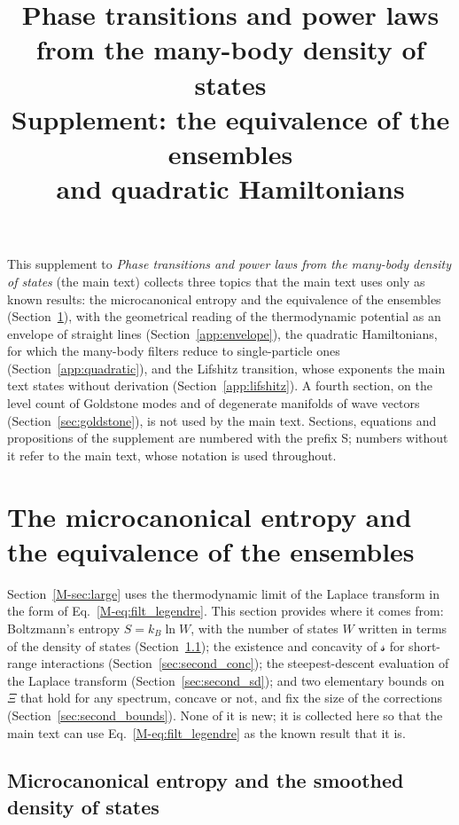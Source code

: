 \documentclass[10pt,a4paper]{article}
\title{Phase transitions and power laws\\ from the many-body density of states\\
\large Supplement: the equivalence of the ensembles\\ and quadratic Hamiltonians}
\author{}
\date{}
\theoremstyle{plain}
\theoremstyle{remark}
\newcommand{\lds}{\mathscr{s}}  %
\begin{document}
\maketitle

\noindent This supplement to \emph{Phase transitions and power laws from
the many-body density of states} (the main text) collects three topics that the main text uses
only as known results: the microcanonical entropy and the equivalence of
the ensembles (Section~\ref{app:second}), with the geometrical reading of
the thermodynamic potential as an envelope of straight lines
(Section~\ref{app:envelope}), the quadratic
Hamiltonians, for which the many-body filters reduce to single-particle
ones (Section~\ref{app:quadratic}), and the Lifshitz transition, whose
exponents the main text states without derivation
(Section~\ref{app:lifshitz}). A fourth section, on the level count of
Goldstone modes and of degenerate manifolds of wave vectors
(Section~\ref{sec:goldstone}), is not used by the main text. Sections, equations and propositions of
the supplement are numbered with the prefix S; numbers without it refer to
the main text, whose notation is used throughout.

\tableofcontents

\section{The microcanonical entropy and the equivalence of the ensembles}
\label{app:second}

Section~\ref{M-sec:large} uses the thermodynamic limit of the Laplace
transform in the form of Eq.~\eqref{M-eq:filt_legendre}. This section provides
where it comes from: Boltzmann's entropy $S=k_B\ln W$, with the number of
states $W$ written in terms of the density of states
(Section~\ref{sec:second_mc}); the existence and concavity of $\lds$ for
short-range interactions (Section~\ref{sec:second_conc}); the
steepest-descent evaluation of the Laplace transform
(Section~\ref{sec:second_sd}); and two elementary bounds on $\Xi$ that hold
for any spectrum, concave or not, and fix the size of the corrections
(Section~\ref{sec:second_bounds}). None of it is new; it is collected here
so that the main text can use Eq.~\eqref{M-eq:filt_legendre} as the known
result that it is.

\subsection{Microcanonical entropy and the smoothed density of states}
\label{sec:second_mc}
\end{document}
